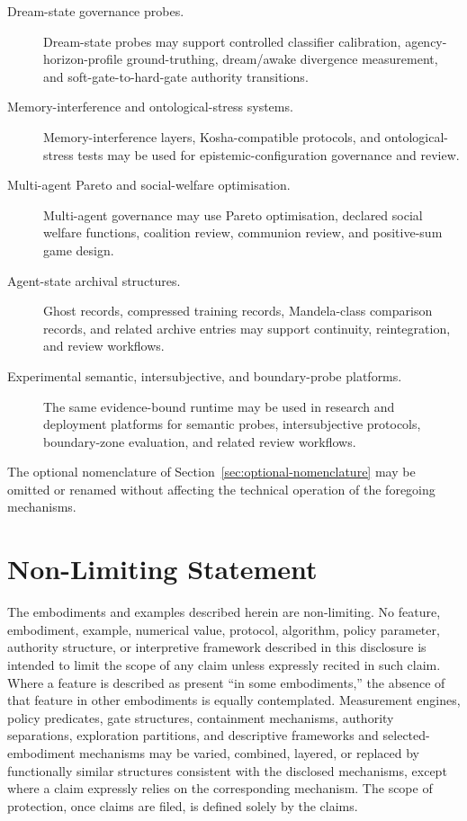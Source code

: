 \documentclass[a4paper,12pt]{article}
\begin{document}
\begin{description}
  \item[Dream-state governance probes.]
  Dream-state probes may support controlled classifier calibration,
  agency-horizon-profile ground-truthing, dream/awake divergence
  measurement, and soft-gate-to-hard-gate authority transitions.

  \item[Memory-interference and ontological-stress systems.]
  Memory-interference layers, Kosha-compatible protocols, and
  ontological-stress tests may be used for epistemic-configuration
  governance and review.

  \item[Multi-agent Pareto and social-welfare optimisation.]
  Multi-agent governance may use Pareto optimisation, declared
  social welfare functions, coalition review, communion review,
  and positive-sum game design.

  \item[Agent-state archival structures.]
  Ghost records, compressed training records, Mandela-class
  comparison records, and related archive entries may support
  continuity, reintegration, and review workflows.

  \item[Experimental semantic, intersubjective, and boundary-probe
  platforms.]
  The same evidence-bound runtime may be used in research and
  deployment platforms for semantic probes, intersubjective
  protocols, boundary-zone evaluation, and related review
  workflows.
\end{description}

The optional nomenclature of Section~\ref{sec:optional-nomenclature}
may be omitted or renamed without affecting the technical operation
of the foregoing mechanisms.

\section{Non-Limiting Statement}


The embodiments and examples described herein are non-limiting. No
feature, embodiment, example, numerical value, protocol, algorithm,
policy parameter, authority structure, or interpretive framework
described in this disclosure is intended to limit the scope of any
claim unless expressly recited in such claim. Where a feature is
described as present ``in some embodiments,'' the absence of that
feature in other embodiments is equally contemplated. Measurement
engines, policy predicates, gate structures, containment mechanisms,
authority separations, exploration partitions, and descriptive
frameworks and selected-embodiment mechanisms may be varied,
combined, layered, or replaced by functionally similar structures
consistent with the disclosed mechanisms, except where a claim
expressly relies on the corresponding mechanism. The scope of protection, once claims are filed, is defined
solely by the claims.
\end{document}
